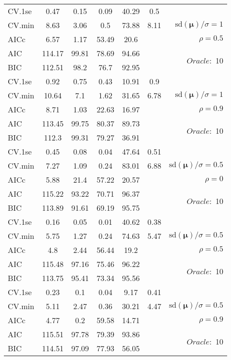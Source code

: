 \begin{table}
\begin{center}
\begin{tabular}{l*{5}{c}|r}
 \hline 
CV.1se & 0.47 & 0.15 & 0.09 & 40.29 & 0.5 & \\
CV.min & 8.63 & 3.06 & 0.5 & 73.88 & 8.11 &  $\mathrm{sd}(\mathbf{\mu})/\sigma=1$ \\
AICc & 6.57 & 1.17 & 53.49 & 20.6 & & $\rho=0.5$ \\
AIC & 114.17 & 99.81 & 78.69 & 94.66 & &  \multirow{2}{*}{$Oracle: $ 10} \\
BIC & 112.51 & 98.2 & 76.7 & 92.95 & &  \\
 \hline 
CV.1se & 0.92 & 0.75 & 0.43 & 10.91 & 0.9 & \\
CV.min & 10.64 & 7.1 & 1.62 & 31.65 & 6.78 &  $\mathrm{sd}(\mathbf{\mu})/\sigma=1$ \\
AICc & 8.71 & 1.03 & 22.63 & 16.97 & & $\rho=0.9$ \\
AIC & 113.45 & 99.75 & 80.37 & 89.73 & &  \multirow{2}{*}{$Oracle: $ 10} \\
BIC & 112.3 & 99.31 & 79.27 & 36.91 & &  \\
 \hline 
CV.1se & 0.45 & 0.08 & 0.04 & 47.64 & 0.51 & \\
CV.min & 7.27 & 1.09 & 0.24 & 83.01 & 6.88 &  $\mathrm{sd}(\mathbf{\mu})/\sigma=0.5$ \\
AICc & 5.88 & 21.4 & 57.22 & 20.57 & & $\rho=0$ \\
AIC & 115.22 & 93.22 & 70.71 & 96.37 & &  \multirow{2}{*}{$Oracle: $ 10} \\
BIC & 113.89 & 91.61 & 69.19 & 95.75 & &  \\
 \hline 
CV.1se & 0.16 & 0.05 & 0.01 & 40.62 & 0.38 & \\
CV.min & 5.75 & 1.27 & 0.24 & 74.63 & 5.47 &  $\mathrm{sd}(\mathbf{\mu})/\sigma=0.5$ \\
AICc & 4.8 & 2.44 & 56.44 & 19.2 & & $\rho=0.5$ \\
AIC & 115.48 & 97.16 & 75.46 & 96.22 & &  \multirow{2}{*}{$Oracle: $ 10} \\
BIC & 113.75 & 95.41 & 73.34 & 95.56 & &  \\
 \hline 
CV.1se & 0.23 & 0.1 & 0.04 & 9.17 & 0.41 & \\
CV.min & 5.11 & 2.47 & 0.36 & 30.21 & 4.47 &  $\mathrm{sd}(\mathbf{\mu})/\sigma=0.5$ \\
AICc & 4.77 & 0.2 & 59.58 & 14.71 & & $\rho=0.9$ \\
AIC & 115.51 & 97.78 & 79.39 & 93.86 & &  \multirow{2}{*}{$Oracle: $ 10} \\
BIC & 114.51 & 97.09 & 77.93 & 56.05 & &  \\
 \hline 
\end{tabular}
\end{center}
\vspace{-1cm}
\end{table}





